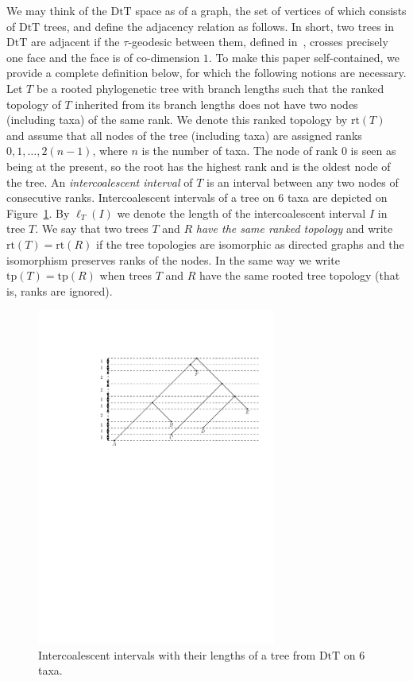 \documentclass{amsart}
\newcommand{\mdts}{\mathrm{DtT}}
\newcommand{\rt}{\mathrm{rt}}
\newcommand{\tp}{\mathrm{tp}}
\begin{document}
We may think of the $\mdts$ space as of a graph, the set of vertices of which consists of $\mdts$ trees, and define the adjacency relation as follows.
In short, two trees in $\mdts$ are adjacent if the $\tau$-geodesic between them, defined in~\cite{Gavryushkin2014-bw}, crosses precisely one face and the face is of co-dimension $1$.
To make this paper self-contained, we provide a complete definition below, for which the following notions are necessary.
Let $T$ be a rooted phylogenetic tree with branch lengths such that the ranked topology of $T$ inherited from its branch lengths does not have two nodes (including taxa) of the same rank.
We denote this ranked topology by $\rt(T)$ and assume that all nodes of the tree (including taxa) are assigned ranks $0,1,\ldots,2(n-1)$, where $n$ is the number of taxa.
The node of rank $0$ is seen as being at the present, so the root has the highest rank and is the oldest node of the tree.
An {\em intercoalescent interval} of $T$ is an interval between any two nodes of consecutive ranks.
Intercoalescent intervals of a tree on $6$ taxa are depicted on Figure~\ref{T5.pdf}.
By $\ell_T(I)$ we denote the length of the intercoalescent interval $I$ in tree $T$.
We say that two trees $T$ and $R$ {\em have the same ranked topology} and write $\rt(T) = \rt(R)$ if the tree topologies are isomorphic as directed graphs and the isomorphism preserves ranks of the nodes.
In the same way we write $\tp(T) = \tp(R)$ when trees $T$ and $R$ have the same rooted tree topology (that is, ranks are ignored).

\begin{figure}
\centering
\includegraphics[width=0.7\textwidth]{T5.pdf}
\caption{Intercoalescent intervals with their lengths of a tree from $\mdts$ on $6$ taxa.}
\label{T5.pdf}
\end{figure}
\end{document}
